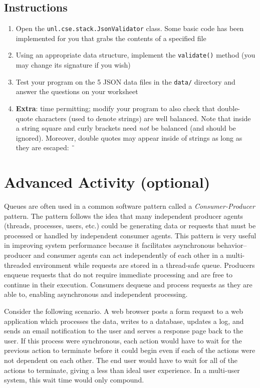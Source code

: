 \documentclass[12pt]{scrartcl}
\begin{document}
\subsection*{Instructions}

\begin{enumerate}
  \item Open the \texttt{unl.cse.stack.JsonValidator} class.
    Some basic code has been implemented for you that grabs the 
    contents of a specified file
  \item Using an appropriate data structure, implement the 
    \texttt{validate()} method (you may change its signature 
    if you wish)
  \item Test your program on the 5 JSON data files in the 
    \texttt{data/} directory and answer the questions 
    on your worksheet
  \item \textbf{Extra}: time permitting; modify your program to also 
    check that double-quote characters (used to denote strings) are 
    well balanced.  Note that inside a string square and curly brackets 
    need \emph{not} be balanced (and should be ignored).  Moreover, 
    double quotes may appear inside of strings as long as they are 
    escaped: \texttt{\"}
\end{enumerate}

\section*{Advanced Activity (optional)}

Queues are often used in a common software pattern called a 
\emph{Consumer-Producer} pattern.  The pattern follows the idea that 
many independent producer agents (threads, processes, users, etc.) 
could be generating data or requests that must be processed or handled 
by independent consumer agents.  This pattern is very useful in 
improving system performance because it facilitates asynchronous 
behavior--producer and consumer agents can act independently of each 
other in a multi-threaded environment while requests are stored in a 
thread-safe queue.  Producers enqueue requests that do not require 
immediate processing and are free to continue in their execution.  
Consumers dequeue and process requests as they are able to, enabling 
asynchronous and independent processing.

Consider the following scenario.  A web browser posts a form request 
to a web application which processes the data, writes to a database, 
updates a log, and sends an email notification to the user and serves 
a response page back to the user.  If this process were synchronous, 
each action would have to wait for the previous action to terminate 
before it could begin even if each of the actions were not dependent 
on each other.  The end user would have to wait for all of the actions 
to terminate, giving a less than ideal user experience.  In a multi-user 
system, this wait time would only compound.
\end{document}
